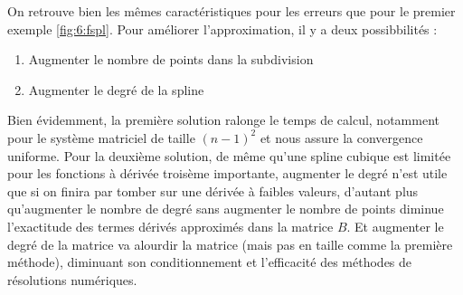 On retrouve bien les mêmes caractéristiques pour les erreurs que pour le premier exemple \ref{fig:6:fspl}. Pour améliorer l'approximation,
il y a deux possibbilités :
\begin{enumerate}
\item Augmenter le nombre de points dans la subdivision
\item Augmenter le degré de la spline
\end{enumerate}
Bien évidemment, la première solution ralonge le temps de calcul, notamment pour le système matriciel de taille $(n-1)^2$ et nous assure la convergence
uniforme. Pour la deuxième solution, de même qu'une spline cubique est limitée pour les fonctions à dérivée troisème importante, augmenter le degré
n'est utile que si on finira par tomber sur une dérivée à faibles valeurs, d'autant plus qu'augmenter le nombre de degré sans augmenter le nombre de points
diminue l'exactitude des termes dérivés approximés dans la matrice $B$. Et augmenter le degré de la matrice va alourdir la matrice (mais pas en taille
comme la première méthode), diminuant son conditionnement et l'efficacité des méthodes de résolutions numériques.
